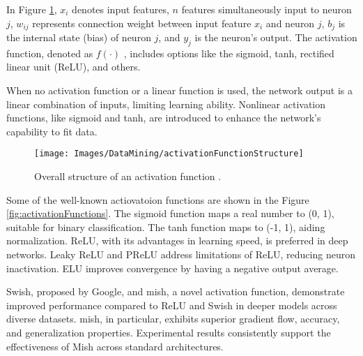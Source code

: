 In Figure \ref{fig:activationFunctionStructure}, $x_i$ denotes input features, $n$ features simultaneously input to neuron $j$, $w_{ij}$ represents connection weight between input feature $x_i$ and neuron $j$, $b_j$ is the internal state (bias) of neuron $j$, and $y_j$ is the neuron's output. The activation function, denoted as $f(·)$ , includes options like the sigmoid, tanh, rectified linear unit (ReLU), and others.

When no activation function or a linear function is used, the network output is a linear combination of inputs, limiting learning ability. Nonlinear activation functions, like sigmoid and tanh, are introduced to enhance the network's capability to fit data.

\begin{figure}[h!]
	\centering
	\texttt{[image: Images/DataMining/activationFunctionStructure]}
	\caption{Overall structure of an activation function \cite{Li:2021}.} \label{fig:activationFunctionStructure}
\end{figure}

Some of the well-known actiovatoion functions are shown in the Figure \ref{fig:activationFunctions}. The sigmoid function maps a real number to (0, 1), suitable for binary classification. The tanh function maps to (-1, 1), aiding normalization. ReLU, with its advantages in learning speed, is preferred in deep networks. Leaky ReLU and PReLU address limitations of ReLU, reducing neuron inactivation. ELU improves convergence by having a negative output average.

Swish, proposed by Google, and mish, a novel activation function, demonstrate improved performance compared to ReLU and Swish in deeper models across diverse datasets. mish, in particular, exhibits superior gradient flow, accuracy, and generalization properties. Experimental results consistently support the effectiveness of Mish across standard architectures.

